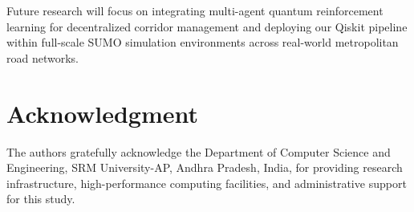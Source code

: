 \documentclass{llncs}
\begin{document}
Future research will focus on integrating multi-agent quantum reinforcement learning for decentralized corridor management and deploying our Qiskit pipeline within full-scale SUMO simulation environments across real-world metropolitan road networks.

\section*{Acknowledgment}
The authors gratefully acknowledge the Department of Computer Science and Engineering, SRM University-AP, Andhra Pradesh, India, for providing research infrastructure, high-performance computing facilities, and administrative support for this study.
\end{document}
